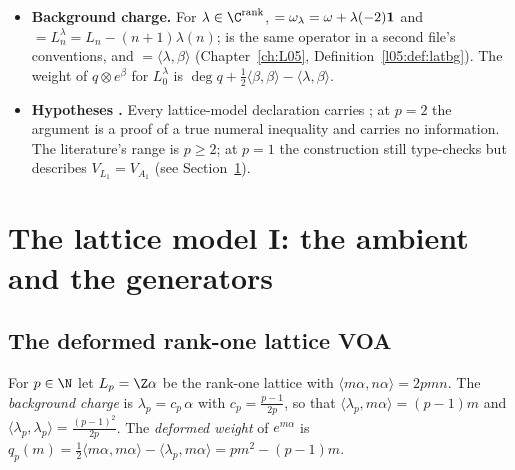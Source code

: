 \begin{itemize}
  is $\leighteenvac=1\otimes e^0$, and  $=\varepsilon(\beta,\gamma)\in\{\pm1\}$
  is the cocycle (Chapter~\ref{ch:L05}, Section~\ref{l05:sec:general}).  is the
  reconstructed vertex map.
\item \textbf{Background charge.} For $\lambda\in\C^{\mathrm{rank}}$, 
  $=\omega_\lambda=\omega+\lambda(-2)\mathbf{1}$ and  $=L^\lambda_n=L_n-(n+1)\lambda(n)$;
   is the same operator in a second file's conventions, and 
  $=\langle\lambda,\beta\rangle$ (Chapter~\ref{ch:L05}, Definition~\ref{l05:def:latbg}). The weight of
  $q\otimes e^\beta$ for $L^\lambda_0$ is $\deg q+\frac12\langle\beta,\beta\rangle-\langle\lambda,\beta\rangle$.
\item \textbf{Hypotheses .} Every lattice-model declaration carries
  ; at $p=2$ the argument  is a proof of a true
  numeral inequality and carries no information. The literature's range is $p\ge2$; at $p=1$ the
  construction still type-checks but describes $V_{L_1}=V_{A_1}$ (see Section~\ref{l18:sec:lattice}).
\end{itemize}

\section{The lattice model I: the ambient and the generators}\label{l18:sec:lattice}

\subsection{The deformed rank-one lattice VOA}

\begin{definition}\label{l18:def:latP}
For $p\in\N$ let $L_p=\Z\alpha$ be the rank-one lattice with $\langle m\alpha,n\alpha\rangle=2pmn$.
The \emph{background charge} is $\lambda_p=c_p\,\alpha$ with $c_p=\frac{p-1}{2p}$, so that
$\langle\lambda_p,m\alpha\rangle=(p-1)m$ and $\langle\lambda_p,\lambda_p\rangle=\frac{(p-1)^2}{2p}$.
The \emph{deformed weight} of $e^{m\alpha}$ is $q_p(m)=\frac12\langle m\alpha,m\alpha\rangle-\langle\lambda_p,m\alpha\rangle=pm^2-(p-1)m$.
\end{definition}

